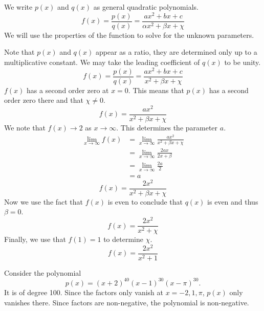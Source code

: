{\begin{Solution}
\label{solution rational quadratic}
We write $p(x)$ and $q(x)$ as general quadratic polynomials.
\[
f(x) = \frac{p(x)}{q(x)} = \frac{a x^2 + b x + c}{\alpha x^2 + \beta x + \chi}
\]
We will use the properties of the function to solve for the unknown 
parameters.

Note that $p(x)$ and $q(x)$ appear as a ratio, they are determined only up to
a multiplicative constant.  We may take the leading coefficient of $q(x)$ to
be unity.
\[
f(x) = \frac{p(x)}{q(x)} = \frac{a x^2 + b x + c}{x^2 + \beta x + \chi}
\]
$f(x)$ has a second order zero at $x = 0$.  This means that $p(x)$ has a
second order zero there and that $\chi \neq 0$.
\[
f(x) = \frac{a x^2}{x^2 + \beta x + \chi}
\]
We note that $f(x) \to 2$ as $x \to \infty$.  This determines the parameter $a$.
\begin{align*}
  \lim_{x \to \infty} f(x)
  &= \lim_{x \to \infty} \frac{a x^2}{x^2 + \beta x + \chi}
  \\
  &= \lim_{x \to \infty} \frac{2 a x}{2 x + \beta}
  \\
  &= \lim_{x \to \infty} \frac{2 a}{2}
  \\
  &= a
\end{align*}
\[
f(x) = \frac{2 x^2}{x^2 + \beta x + \chi}
\]
Now we use the fact that $f(x)$ is even to conclude that $q(x)$ is even and
thus $\beta = 0$.
\[
f(x) = \frac{2 x^2}{x^2 + \chi}
\]
Finally, we use that $f(1) = 1$ to determine $\chi$.
\[
\boxed{
  f(x) = \frac{2 x^2}{x^2 + 1}
  }
\]
\end{Solution}








\begin{Solution}
\label{solution polynomial 100}
Consider the polynomial
\[
p(x) = (x + 2)^{40} (x - 1)^{30} (x - \pi)^{30}.
\]
It is of degree 100. Since the factors only vanish at $x = -2,1,\pi$, $p(x)$ 
only vanishes there.  Since factors are non-negative, the polynomial is 
non-negative.
\end{Solution}







\raggedbottom
}





